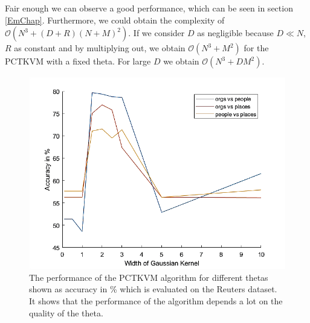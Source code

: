 Fair enough we can observe a good performance, which can be seen in section \ref{EmChap}.
Furthermore, we could obtain the complexity of $\mathcal{O}(N^3+(D+R)(N+M)^2)$.
If we consider $D$ as negligible because $D \ll N$, $R$ as constant and by multiplying out, we obtain $\mathcal{O}(N^3+M^2)$ for the \acs{PCTKVM} with a fixed theta.
For large $D$ we obtain $\mathcal{O}(N^3+DM^2)$.
\begin{figure}
	\centering
		\includegraphics[width=.8\linewidth]{figures/PerformanceGaussianKernel.png}
	\caption[Perfomance in Dependence of Theta]{The performance of the \acs{PCTKVM} algorithm for different thetas shown as accuracy in \% which is evaluated on the Reuters dataset. It shows that the performance of the algorithm depends a lot on the quality of the theta.}
	\label{FigPerfomanceTheta}
\end{figure}
\FloatBarrier
